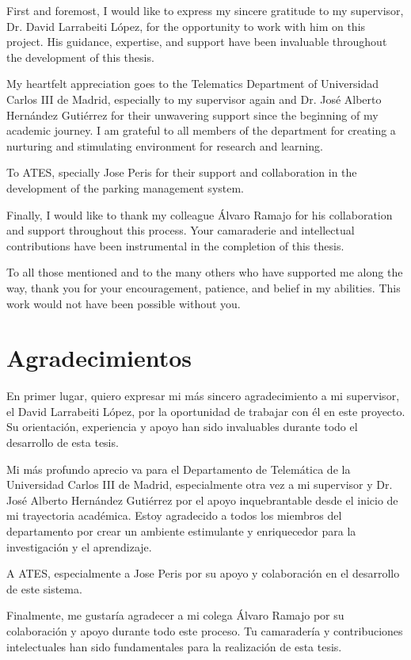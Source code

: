\documentclass[oneside, 12pt, a4paper]{book}
\begin{document}
First and foremost, I would like to express my sincere gratitude to my supervisor, Dr. David Larrabeiti López, for the opportunity to work with him on this project. His guidance, expertise, and support have been invaluable throughout the development of this thesis.

My heartfelt appreciation goes to the Telematics Department of Universidad Carlos III de Madrid, especially to my supervisor again and Dr. José Alberto Hernández Gutiérrez for their unwavering support since the beginning of my academic journey. I am grateful to all members of the department for creating a nurturing and stimulating environment for research and learning.

To ATES, specially Jose Peris for their support and collaboration in the development of the parking management system.

Finally, I would like to thank my colleague Álvaro Ramajo for his collaboration and support throughout this process. Your camaraderie and intellectual contributions have been instrumental in the completion of this thesis.

To all those mentioned and to the many others who have supported me along the way, thank you for your encouragement, patience, and belief in my abilities. This work would not have been possible without you.

\chapter*{Agradecimientos}

En primer lugar, quiero expresar mi más sincero agradecimiento a mi supervisor, el David Larrabeiti López, por la oportunidad de trabajar con él en este proyecto. Su orientación, experiencia y apoyo han sido invaluables durante todo el desarrollo de esta tesis.

Mi más profundo aprecio va para el Departamento de Telemática de la Universidad Carlos III de Madrid, especialmente otra vez a mi supervisor y Dr. José Alberto Hernández Gutiérrez por el apoyo inquebrantable desde el inicio de mi trayectoria académica. Estoy agradecido a todos los miembros del departamento por crear un ambiente estimulante y enriquecedor para la investigación y el aprendizaje.

A ATES, especialmente a Jose Peris por su apoyo y colaboración en el desarrollo de este sistema.

Finalmente, me gustaría agradecer a mi colega Álvaro Ramajo por su colaboración y apoyo durante todo este proceso. Tu camaradería y contribuciones intelectuales han sido fundamentales para la realización de esta tesis.
\end{document}

